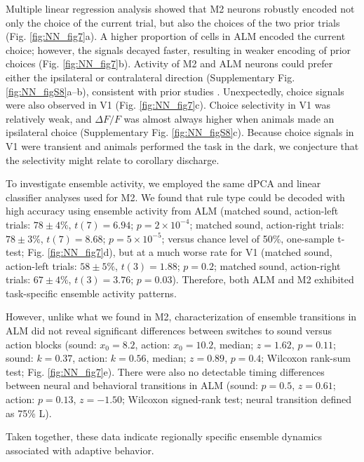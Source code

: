 Multiple linear regression analysis showed that M2 neurons robustly encoded not only the choice of the current trial, but also the choices of the two prior trials (Fig. \ref{fig:NN_fig7}a). A higher proportion of cells in ALM encoded the current choice; however, the signals decayed faster, resulting in weaker encoding of prior choices (Fig. \ref{fig:NN_fig7}b). Activity of M2 and ALM neurons could prefer either the ipsilateral or contralateral direction (Supplementary Fig. \ref{fig:NN_figS8}a--b), consistent with prior studies \citep{erlich2011cortical,li2015motor}. Unexpectedly, choice signals were also observed in V1 (Fig. \ref{fig:NN_fig7}c). Choice selectivity in V1 was relatively weak, and $\Delta F/F$ was almost always higher when animals made an ipsilateral choice (Supplementary Fig. \ref{fig:NN_figS8}c). Because choice signals in V1 were transient and animals performed the task in the dark, we conjecture that the selectivity might relate to corollary discharge. 



To investigate ensemble activity, we employed the same dPCA and linear classifier analyses used for M2. We found that rule type could be decoded with high accuracy using ensemble activity from ALM (matched sound, action-left trials: $78 \pm 4\%$, $t(7) = 6.94$; $p = 2 \times 10^{-4}$; matched sound, action-right trials: $78 \pm 3\%$, $t(7) = 8.68$; $p = 5 \times 10^{-5}$; versus chance level of 50\%, one-sample t-test; Fig. \ref{fig:NN_fig7}d), but at a much worse rate for V1 (matched sound, action-left trials: $58 \pm 5\%$, $t(3) = 1.88$; $p = 0.2$; matched sound, action-right trials: $67 \pm 4\%$, $t(3) = 3.76$; $p = 0.03$). Therefore, both ALM and M2 exhibited task-specific ensemble activity patterns. 

However, unlike what we found in M2, characterization of ensemble transitions in ALM did not reveal significant differences between switches to sound versus action blocks (sound: $x_0 = 8.2$, action: $x_0 = 10.2$, median; $z = 1.62$, $p = 0.11$; sound: $k = 0.37$, action: $k = 0.56$, median; $z = 0.89$, $p = 0.4$; Wilcoxon rank-sum test; Fig. \ref{fig:NN_fig7}e). There were also no detectable timing differences between neural and behavioral transitions in ALM (sound: $p = 0.5$, $z = 0.61$; action: $p = 0.13$, $z = -1.50$; Wilcoxon signed-rank test; neural transition defined as 75\% L). 

Taken together, these data indicate regionally specific ensemble dynamics associated with adaptive behavior.